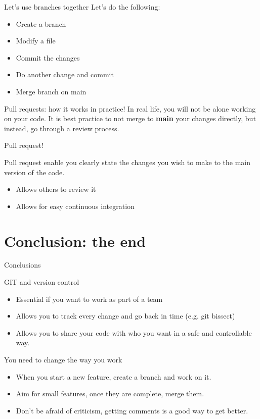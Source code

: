 \documentclass[c,11pt,xcolor=dvipsnames, aspectratio=169]{beamer}
\begin{document}
\begin{frame}[fragile]{Let's use branches together}
	Let's do the following:
	\begin{itemize}
	\item Create a branch
	\item Modify a file
	\item Commit the changes
	\item Do another change and commit
	\item Merge branch on main
	\end{itemize}
\end{frame}


\begin{frame}[fragile]{Pull requests: how it works in practice!}
In real life, you will not be alone working on your code. It is best practice to not merge to \textbf{main} your changes directly, but instead, go through a review process. 

{
	\begin{block}{Pull request!}

		Pull request enable you clearly state the changes you wish to make to the main version of the code.
		\begin{itemize}
		\item Allows others to review it 
		\item Allows for easy continuous integration
		\end{itemize}

	\end{block}
}

\end{frame}

\section{Conclusion: the end}

\begin{frame}{Conclusions}
\begin{block}{GIT and version control}
	\begin{itemize}
	\item Essential if you want to work as part of a team
	\item Allows you to track every change and go back in time (e.g. git bissect)
	\item Allows you to share your code with who you want in a safe and controllable way.
	\end{itemize}
\end{block}

\begin{block}{You need to change the way you work}
	\begin{itemize}
	\item When you start a new feature, create a branch and work on it.
	\item Aim for small features, once they are complete, merge them.
	\item Don't be afraid of criticism, getting comments is a good way to get better.
	\end{itemize}
\end{block}
\end{frame}
\end{document}
